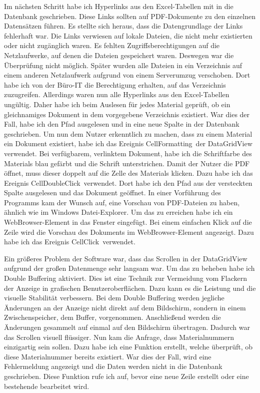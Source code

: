 \documentclass{Vorlage}
\begin{document}
Im nächsten Schritt habe ich Hyperlinks aus den Excel-Tabellen mit in die Datenbank geschrieben. Diese Links 
sollten auf PDF-Dokumente zu den einzelnen Datensätzen führen. Es stellte sich heraus, dass die Datengrundlage
der Links fehlerhaft war. Die Links verwiesen auf lokale Dateien, die nicht mehr existierten oder nicht
zugänglich waren. Es fehlten Zugriffsberechtigungen auf die Netzlaufwerke, auf denen die Dateien gespeichert 
waren. Deswegen war die Überprüfung 
nicht möglich. Später wurden alle Dateien in ein Verzeichnis auf einem anderen Netzlaufwerk aufgrund 
von einem Serverumzug verschoben. Dort habe ich von der Büro-IT die Berechtigung erhalten, auf das Verzeichnis
zuzugreifen. Allerdings waren nun alle Hyperlinks aus den Excel-Tabellen ungültig. Daher habe ich beim 
Auslesen für jedes Material geprüft, ob ein gleichnamiges Dokument in dem vorgegebene Verzeichnis existiert.
War dies der Fall, habe ich den Pfad ausgelesen und in eine neue Spalte in der Datenbank geschrieben.
Um nun dem Nutzer erkenntlich zu machen, dass zu einem Material ein Dokument existiert, habe ich das 
Ereignis \glqq CellFormatting\grqq \, der DataGridView verwendet. Bei verfügbarem, verlinktem Dokument, 
habe ich die Schriftfarbe des Materials
blau gefärbt und die Schrift unterstrichen. Damit der Nutzer die PDF öffnet, muss dieser doppelt auf die 
Zelle des Materials klicken. Dazu habe ich das Ereignis \glqq CellDoubleClick\grqq \, verwendet. Dort habe
ich den Pfad aus der versteckten Spalte ausgelesen und das Dokument geöffnet. In einer Vorführung des
Programms kam der Wunsch auf, eine Vorschau von PDF-Dateien zu haben, ähnlich wie im Windows Datei-Explorer.
Um das zu erreichen habe ich ein \glqq WebBrowser\grqq-Element in das Fenster eingefügt.
Bei einem einfachen Klick auf die Zeile wird die Vorschau des Dokuments im WebBrowser-Element angezeigt.
Dazu habe ich das Ereignis \glqq CellClick\grqq \, verwendet. 

Ein größeres Problem der Software war, dass das Scrollen in der DataGridView aufgrund der großen Datenmenge 
sehr langsam war. Um das zu beheben habe ich Double Buffering aktiviert. Dies ist eine Technik zur 
Vermeidung vom Flackern der Anzeige in grafischen Benutzeroberflächen. Dazu kann es die Leistung und die
visuelle Stabilität verbessern. Bei dem Double Buffering werden jegliche Änderungen an der Anzeige nicht
direkt auf dem Bildschirm, sondern in einem Zwischenspeicher, dem Buffer, vorgenommen. Anschließend werden
die Änderungen gesammelt auf einmal auf den Bildschirm übertragen.
Dadurch war das Scrollen 
visuell flüssiger. 
Nun kam die Anfrage, dass Materialnummern einzigartig sein sollen. Dazu habe ich eine Funktion erstellt,
welche überprüft, ob diese Materialnummer bereits existiert. War dies der Fall, wird eine Fehlermeldung
angezeigt und die Daten werden nicht in die Datenbank geschrieben. Diese Funktion rufe ich auf, bevor 
eine neue Zeile erstellt oder eine bestehende bearbeitet wird. 
\end{document}

